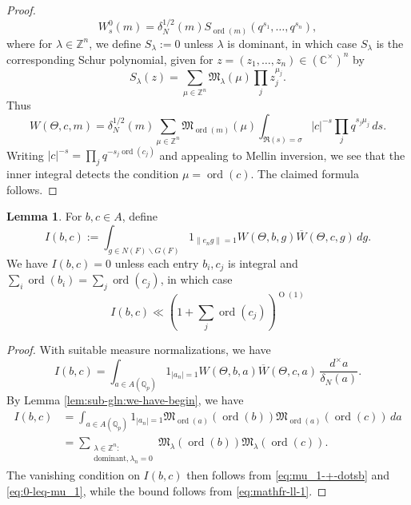 \documentclass[reqno]{amsart}
\def\O{\operatorname{O}}
\DeclareMathOperator{\ord}{ord}
\theoremstyle{plain} \newtheorem{theorem} {Theorem}
\theoremstyle{definition} \newtheorem{definition} [theorem] {Definition}
\theoremstyle{itplain} %
\newtheorem{lemma}[theorem]{Lemma}
\numberwithin{equation}{section}
\numberwithin{theorem}{section}
\begin{document}
\begin{proof}
\begin{equation*}
    W_s^0(m) = \delta_N^{1/2}(m) S_{\ord(m)}(q^{s_1}, \dotsc, q^{s_n}),
  \end{equation*}
  where for $\lambda \in \mathbb{Z}^n$, we define $S_\lambda := 0$ unless $\lambda$ is dominant, in which case $S_\lambda$ is the corresponding Schur polynomial, given for $z = (z_1,\dotsc,z_n) \in (\mathbb{C}^\times)^n$ by
  \begin{equation*}
    S_\lambda(z) = \sum_{\mu \in \mathbb{Z}^n} \mathfrak{M}_{\lambda}(\mu) \prod_j z_j^{\mu_j}.
  \end{equation*}
  Thus
  \begin{equation*}
    W(\Theta,c,m) =
    \delta_N^{1/2}(m)
    \sum_{\mu \in \mathbb{Z}^n}
    \mathfrak{M}_{\ord(m)}(\mu)
    \int _{\Re(s) = \sigma } |c|^{-s} \prod_j q^{s_j \mu_j} \, d s.
  \end{equation*}
  Writing $|c|^{-s} = \prod_j q^{-s_j \ord(c_j)}$ and appealing to Mellin inversion, we see that the inner integral detects the condition $\mu = \ord(c)$.  The claimed formula follows.
\end{proof}

\begin{lemma}\label{lem:sub-gln:b-c-in}
For $b, c \in A$, define
\begin{equation*}
  I(b,c) :=
  \int _{g \in N(F) \backslash G(F)}
  1_{\|e_n g\| = 1}
  W  (\Theta, b, g) \overline{W }(\Theta, c, g)
   \, d g.
\end{equation*}
We have $I(b,c) = 0$ unless each entry $b_i,c_j$ is integral and $\sum_i \ord(b_i) = \sum_j \ord(c_j)$, in which case
\begin{equation*}
  I(b,c) \ll (1 + \sum_j \ord(c_j))^{\O(1)}
\end{equation*}
\end{lemma}
\begin{proof}
  With suitable measure normalizations, we have
  \begin{equation*}
  I(b,c) =
  \int _{a \in A(\mathbb{Q}_p)}
  1_{|a_n| = 1}
  W  (\Theta, b, a) \overline{W }(\Theta, c, a)
   \, \frac{d^\times a}{\delta_N(a)}.
\end{equation*}
  By Lemma \ref{lem:sub-gln:we-have-begin}, we have
  \begin{align*}
    I(b,c) &=
             \int _{a \in A(\mathbb{Q}_p)}
             1 _{|a_n| = 1}
             \mathfrak{M}_{\ord(a)} (\ord (b)) \mathfrak{M} _{\ord (a)} (\ord (c)) \, d a \\
    &=
    \sum _{
      \substack{
        \lambda  \in \mathbb{Z}^n:  \\
         \text{dominant}, \lambda_n = 0
      }
    }
    \mathfrak{M}_{\lambda }(\ord(b))
    \mathfrak{M}_{\lambda }(\ord(c)).
  \end{align*}
  The vanishing condition on $I(b,c)$ then follows from \eqref{eq:mu_1-+-dotsb} and \eqref{eq:0-leq-mu_1}, while the bound follows from \eqref{eq:mathfr-ll-1}.
\end{proof}
\end{document}
